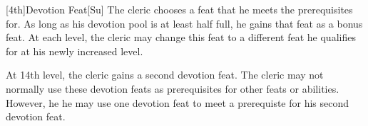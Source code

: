         [4th]{Devotion Feat}[Su]
        The cleric chooses a feat that he meets the prerequisites for.
        As long as his devotion pool is at least half full, he gains that feat as a bonus feat.
        At each level, the cleric may change this feat to a different feat he qualifies for at his newly increased level.

        At 14th level, the cleric gains a second devotion feat.
        The cleric may not normally use these devotion feats as prerequisites for other feats or abilities.
        However, he he may use one devotion feat to meet a prerequiste for his second devotion feat.
